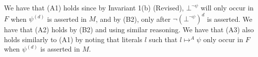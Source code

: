 \documentclass{llncs}
\begin{document}
We have that (A1) holds since by Invariant 1(b) (Revised), $\bot^{\neg \psi}$ will only occur in $F$ when $\psi^{(d)}$ is asserted in $M$, and by (B2), only after $\neg (\bot^{\neg \psi})^d$ is asserted.
We have that (A2) holds by (B2) and using similar reasoning.
We have that (A3) also holds similarly to (A1) by noting that literals $l$ such that $l \mapsto^A \psi$ only occur in $F$ when $\psi^{(d)}$ is asserted in $M$.
\end{document}

